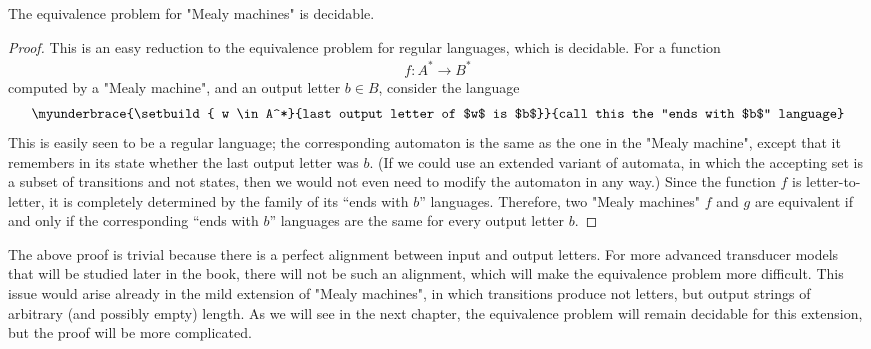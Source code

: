 \begin{theorem}\label{thm:equivalence-decidable-mealy}
    The equivalence problem for "Mealy machines" is decidable.
\end{theorem}
\begin{proof}
    This is an easy reduction to the equivalence problem for regular languages, which is decidable. For a function 
    \begin{align*}
    f : A^* \to B^*
    \end{align*}
     computed by a "Mealy machine", and an output letter $b \in B$, consider the language 
    \begin{align*}
     \myunderbrace{\setbuild{ w \in A^*}{last output letter of $w$ is $b$}}{call this the ``ends with $b$'' language}
    \end{align*}
    This is easily seen to be a regular language; the corresponding automaton is the same as the one in the "Mealy machine", except that it remembers in its state whether the last output letter was $b$. (If we could use an extended variant of automata, in which the accepting set is a subset of transitions and not states, then we would not even need to modify the automaton in any way.)
    Since the function $f$ is letter-to-letter, it is completely determined by the family of its ``ends with $b$'' languages. Therefore, two "Mealy machines" $f$ and $g$ are equivalent if and only if the corresponding ``ends with $b$'' languages are the same for every output letter $b$.
\end{proof}

The above proof is trivial because there is a perfect alignment between input and output letters. For more advanced transducer models that will be studied later in the book, there will not be such an alignment, which will make the equivalence problem  more difficult. This issue would arise already in the mild extension of "Mealy machines", in which transitions produce not letters, but output strings of arbitrary (and possibly empty) length. As we will see in the next chapter, the equivalence problem will remain decidable for this extension, but the proof will be more complicated. 


